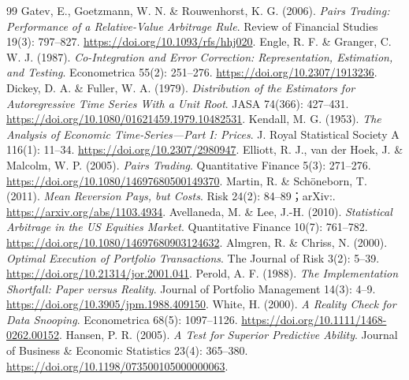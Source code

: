 \begin{thebibliography}{99}
 Gatev, E., Goetzmann, W. N. \& Rouwenhorst, K. G. (2006). \emph{Pairs Trading: Performance of a Relative-Value Arbitrage Rule}. Review of Financial Studies 19(3): 797--827. \href{https://doi.org/10.1093/rfs/hhj020}{https://doi.org/10.1093/rfs/hhj020}.
 Engle, R. F. \& Granger, C. W. J. (1987). \emph{Co-Integration and Error Correction: Representation, Estimation, and Testing}. Econometrica 55(2): 251--276. \href{https://doi.org/10.2307/1913236}{https://doi.org/10.2307/1913236}.
 Dickey, D. A. \& Fuller, W. A. (1979). \emph{Distribution of the Estimators for Autoregressive Time Series With a Unit Root}. JASA 74(366): 427--431. \href{https://doi.org/10.1080/01621459.1979.10482531}{https://doi.org/10.1080/01621459.1979.10482531}.
 Kendall, M. G. (1953). \emph{The Analysis of Economic Time-Series---Part I: Prices}. J. Royal Statistical Society A 116(1): 11--34. \href{https://doi.org/10.2307/2980947}{https://doi.org/10.2307/2980947}.
 Elliott, R. J., van der Hoek, J. \& Malcolm, W. P. (2005). \emph{Pairs Trading}. Quantitative Finance 5(3): 271--276. \href{https://doi.org/10.1080/14697680500149370}{https://doi.org/10.1080/14697680500149370}.
 Martin, R. \& Schöneborn, T. (2011). \emph{Mean Reversion Pays, but Costs}. Risk 24(2): 84--89；arXiv:. \href{https://arxiv.org/abs/1103.4934}{https://arxiv.org/abs/1103.4934}.
 Avellaneda, M. \& Lee, J.-H. (2010). \emph{Statistical Arbitrage in the US Equities Market}. Quantitative Finance 10(7): 761--782. \href{https://doi.org/10.1080/14697680903124632}{https://doi.org/10.1080/14697680903124632}.
 Almgren, R. \& Chriss, N. (2000). \emph{Optimal Execution of Portfolio Transactions}. The Journal of Risk 3(2): 5--39. \href{https://doi.org/10.21314/jor.2001.041}{https://doi.org/10.21314/jor.2001.041}.
 Perold, A. F. (1988). \emph{The Implementation Shortfall: Paper versus Reality}. Journal of Portfolio Management 14(3): 4--9. \href{https://doi.org/10.3905/jpm.1988.409150}{https://doi.org/10.3905/jpm.1988.409150}.
 White, H. (2000). \emph{A Reality Check for Data Snooping}. Econometrica 68(5): 1097--1126. \href{https://doi.org/10.1111/1468-0262.00152}{https://doi.org/10.1111/1468-0262.00152}.
 Hansen, P. R. (2005). \emph{A Test for Superior Predictive Ability}. Journal of Business \& Economic Statistics 23(4): 365--380. \href{https://doi.org/10.1198/073500105000000063}{https://doi.org/10.1198/073500105000000063}.

\end{thebibliography}
